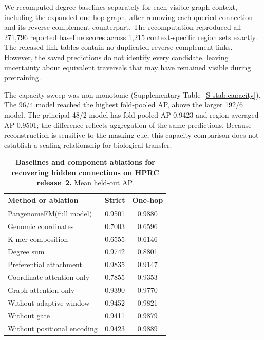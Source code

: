 \documentclass[11pt]{article}
\newcommand{\method}{PangenomeFM\xspace}
\begin{document}
\begin{bibunit}[unsrtnat]
We recomputed degree baselines separately for each visible graph context, including the expanded one-hop graph, after removing each queried connection and its reverse-complement counterpart. The recomputation reproduced all 271,796 reported baseline scores across 1,215 context-specific region sets exactly. The released link tables contain no duplicated reverse-complement links. However, the saved predictions do not identify every candidate, leaving uncertainty about equivalent traversals that may have remained visible during pretraining.

The capacity sweep was non-monotonic (Supplementary Table~\ref{S-stab:capacity}). The 96/4 model reached the highest fold-pooled AP, above the larger 192/6 model. The principal 48/2 model has fold-pooled AP 0.9423 and region-averaged AP 0.9501; the difference reflects aggregation of the same predictions. Because reconstruction is sensitive to the masking cue, this capacity comparison does not establish a scaling relationship for biological transfer.

\begin{table}[H]
\centering
\caption{\textbf{Baselines and component ablations for recovering hidden connections on HPRC release~2.} Mean held-out AP.}
\label{S-stab:baselines}
\small
\begin{tabular}{@{}lcc@{}}
\toprule
Method or ablation & Strict & One-hop \\
\midrule
\method (full model) & 0.9501 & 0.9880 \\
\midrule
Genomic coordinates & 0.7003 & 0.6596 \\
K-mer composition & 0.6555 & 0.6146 \\
Degree sum & 0.9742 & 0.8801 \\
Preferential attachment & 0.9835 & 0.9147 \\
\midrule
Coordinate attention only & 0.7855 & 0.9353 \\
Graph attention only & 0.9390 & 0.9770 \\
Without adaptive window & 0.9452 & 0.9821 \\
Without gate & 0.9411 & 0.9879 \\
Without positional encoding & 0.9423 & 0.9889 \\
\bottomrule
\end{tabular}
\end{table}


\end{bibunit}
\end{document}
